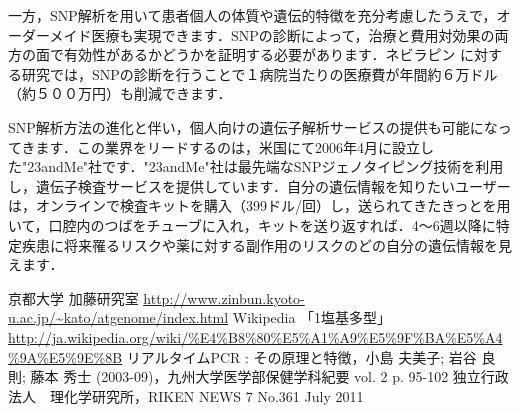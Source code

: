 \documentclass[a4paper,11pt]{jsarticle}
\numberwithin{theorem}{section}  %
\numberwithin{equation}{section} %
\begin{document}
一方，SNP解析を用いて患者個人の体質や遺伝的特徴を充分考慮したうえで，オーダーメイド医療も実現できます．SNPの診断によって，治療と費用対効果の両方の面で有効性があるかどうかを証明する必要があります．ネビラピン\cite{ordermade} に対する研究では，SNPの診断を行うことで１病院当たりの医療費が年間約６万ドル（約５００万円）も削減できます．

SNP解析方法の進化と伴い，個人向けの遺伝子解析サービスの提供も可能になってきます．この業界をリードするのは，米国にて2006年4月に設立した"23andMe"社です．"23andMe"社は最先端なSNPジェノタイピング技術を利用し，遺伝子検査サービスを提供しています．自分の遺伝情報を知りたいユーザーは，オンラインで検査キットを購入（399ドル/回）し，送られてきたきっとを用いて，口腔内のつばをチューブに入れ，キットを送り返すれば．4～6週以降に特定疾患に将来罹るリスクや薬に対する副作用のリスクのどの自分の遺伝情報を見えます．


\begin{thebibliography}{99}
 京都大学 加藤研究室 \url{http://www.zinbun.kyoto-u.ac.jp/~kato/atgenome/index.html}
 Wikipedia 「1塩基多型」 \url{http://ja.wikipedia.org/wiki/%E4%B8%80%E5%A1%A9%E5%9F%BA%E5%A4%9A%E5%9E%8B}
 リアルタイムPCR : その原理と特徴，小島 夫美子;  岩谷 良則;  藤本 秀士 (2003-09)，九州大学医学部保健学科紀要	vol. 2 p. 95-102 
 独立行政法人　理化学研究所，RIKEN NEWS 7 No.361 July 2011
\end{thebibliography}
\end{document}
